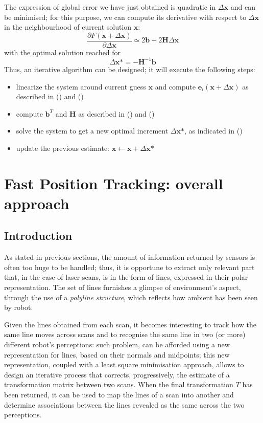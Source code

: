 \documentclass[a4paper, onecolumn]{report}
\begin{document}
The expression of global error we have just obtained is quadratic in $\Delta\textbf{x}$ and can be minimised; for this purpose, we can compute its derivative with respect to $\Delta\textbf{x}$ in the neighbourhood of current solution $\textbf{x}$:
\begin{equation}
\frac{\partial F(\textbf{x}+\Delta\textbf{x})}{\partial\Delta\textbf{x}} \simeq 2\textbf{b} + 2\textbf{H}\Delta\textbf{x}
\end{equation}
with the optimal solution reached for 
\begin{equation}
\Delta\textbf{x*} = -\textbf{H}^{-1}\textbf{b}
\end{equation}
Thus, an iterative algorithm can be designed; it will execute the following steps:
\begin{itemize}
	\item{linearize the system around current guess $\textbf{x}$ and compute $\textbf{e}_i(\textbf{x} + \Delta\textbf{x})$ as described in () and ()}
	\item{compute $\textbf{b}^T$ and $\textbf{H}$ as described in () and ()}
	\item{solve the system to get a new optimal increment $\Delta\textbf{x*}$, as indicated in ()}
	\item{update the previous estimate: $\textbf{x} \leftarrow \textbf{x} + \Delta\textbf{x*}$}
\end{itemize}


\chapter{Fast Position Tracking: overall approach}

\section{Introduction}
As stated in previous sections, the amount of information returned by sensors is often too huge to be handled; thus, it is opportune to extract only relevant part that, in the case of laser scans, is in the form of lines, expressed in their polar representation. The set of lines furnishes a glimpse of environment's aspect, through the use of a \emph{polyline structure}, which reflects how ambient has been seen by robot.

Given the lines obtained from each scan, it becomes interesting to track how the same line moves across scans and to recognise the same line in two (or more) different robot's perceptions: such problem, can be afforded using a new representation for lines, based on their normals and midpoints; this new representation, coupled with a least square minimisation approach, allows to design an iterative process that corrects, progressively, the estimate of a transformation matrix between two scans. When the final transformation $T$ has been returned, it can be used to map the lines of a scan into another and determine associations between the lines revealed as the same across the two perceptions.
\end{document}
